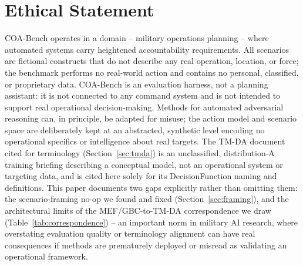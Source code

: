\documentclass[letterpaper]{article} %
\begin{document}
\section*{Ethical Statement}

COA-Bench operates in a domain -- military operations planning -- where automated systems carry heightened accountability requirements. All scenarios are fictional constructs that do not describe any real operation, location, or force; the benchmark performs no real-world action and contains no personal, classified, or proprietary data. COA-Bench is an evaluation harness, not a planning assistant: it is not connected to any command system and is not intended to support real operational decision-making. Methods for automated adversarial reasoning can, in principle, be adapted for misuse; the action model and scenario space are deliberately kept at an abstracted, synthetic level encoding no operational specifics or intelligence about real targets. The TM-DA document cited for terminology (Section~\ref{sec:tmda}) is an unclassified, distribution-A training briefing describing a conceptual model, not an operational system or targeting data, and is cited here solely for its DecisionFunction naming and definitions. This paper documents two gaps explicitly rather than omitting them: the scenario-framing no-op we found and fixed (Section~\ref{sec:framing}), and the architectural limits of the MEF/GBC-to-TM-DA correspondence we draw (Table~\ref{tab:correspondence}) -- an important norm in military AI research, where overstating evaluation quality or terminology alignment can have real consequences if methods are prematurely deployed or misread as validating an operational framework.



\end{document}
